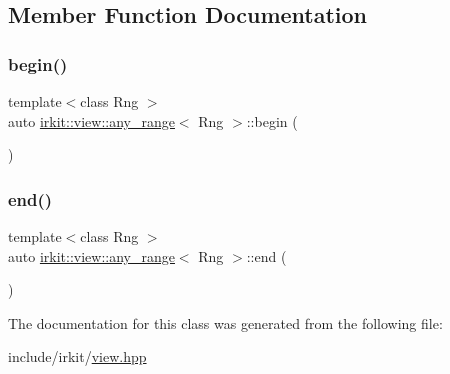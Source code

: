 \subsection{Member Function Documentation}
\mbox{\label{classirkit_1_1view_1_1any__range_a99da248f7fb3fa9e78300f80ee9c8409}} 
\subsubsection{\texorpdfstring{begin()}{begin()}}
{\footnotesize\ttfamily template$<$class Rng $>$ \\
auto \mbox{\hyperlink{classirkit_1_1view_1_1any__range}{irkit\+::view\+::any\+\_\+range}}$<$ Rng $>$\+::begin (\begin{DoxyParamCaption}{ }\end{DoxyParamCaption})\hspace{0.3cm}{\ttfamily [inline]}}

\mbox{\label{classirkit_1_1view_1_1any__range_a192d3e988c56a36695f9ad11c36cb5a6}} 
\subsubsection{\texorpdfstring{end()}{end()}}
{\footnotesize\ttfamily template$<$class Rng $>$ \\
auto \mbox{\hyperlink{classirkit_1_1view_1_1any__range}{irkit\+::view\+::any\+\_\+range}}$<$ Rng $>$\+::end (\begin{DoxyParamCaption}{ }\end{DoxyParamCaption})\hspace{0.3cm}{\ttfamily [inline]}}



The documentation for this class was generated from the following file\+:\begin{DoxyCompactItemize}
\item 
include/irkit/\mbox{\hyperlink{view_8hpp}{view.\+hpp}}\end{DoxyCompactItemize}
